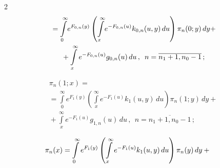 \begin{multicols}{2}
\begin{multline}
{}= \int\limits_0^\infty\! e^{F_{0,n}(y)} \left(


\int\limits_x^\infty\! e^{-F_{0,n}(u)} k_{0,n}(u,y)\, du \right)


\pi_n(0;y)\, dy+


\\


{}+


\int\limits_x^\infty e^{-F_{0,n}(u)} g_{0,n}(u)\, du\,,


\enskip n=\overline{n_1+1,n_0-1}\,;


\end{multline}










\vspace*{-12pt}





\noindent


\begin{multline}


\label{int-3-m}


\pi_n(1;x) ={}\\


{}= \int\limits_0^\infty e^{F_{1}(y)} \left(


\int\limits_x^\infty e^{-F_{1}(u)} k_{1}(u,y)\, du\right)


\pi_n(1;y)\, dy


+{}


\\


{}+


\int\limits_x^\infty e^{-F_{1}(u)} g_{1,n}(u)\, du\,,


\ \ n=\overline{n_1+1,n_0-1}\,;


\end{multline}




\begin{multline}


\label{int-4-m}


\hspace*{-5mm}\pi_n(x) = \int\limits_0^\infty e^{F_{1}(y)} \left(


\int\limits_x^\infty e^{-F_{1}(u)} k_{1}(u,y)\, du \right)


\pi_n(y)\, dy +{}\\



\end{multline}
\end{multicols}
